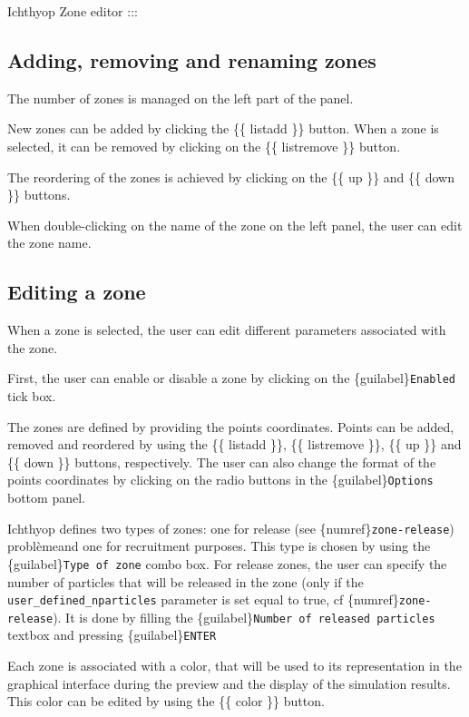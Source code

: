 \documentclass[
  letterpaper,
  DIV=11,
  numbers=noendperiod]{scrreprt}
\begin{document}
Ichthyop Zone editor :::

\subsection{Adding, removing and renaming
zones}\label{adding-removing-and-renaming-zones}

The number of zones is managed on the left part of the panel.

New zones can be added by clicking the \{\{ listadd \}\} button. When a
zone is selected, it can be removed by clicking on the \{\{ listremove
\}\} button.

The reordering of the zones is achieved by clicking on the \{\{ up \}\}
and \{\{ down \}\} buttons.

When double-clicking on the name of the zone on the left panel, the user
can edit the zone name.

\subsection{Editing a zone}\label{editing-a-zone}

When a zone is selected, the user can edit different parameters
associated with the zone.

First, the user can enable or disable a zone by clicking on the
\{guilabel\}\texttt{Enabled} tick box.

The zones are defined by providing the points coordinates. Points can be
added, removed and reordered by using the \{\{ listadd \}\}, \{\{
listremove \}\}, \{\{ up \}\} and \{\{ down \}\} buttons, respectively.
The user can also change the format of the points coordinates by
clicking on the radio buttons in the \{guilabel\}\texttt{Options} bottom
panel.

Ichthyop defines two types of zones: one for release (see
\{numref\}\texttt{zone-release}) problèmeand one for recruitment
purposes. This type is chosen by using the
\{guilabel\}\texttt{Type\ of\ zone} combo box. For release zones, the
user can specify the number of particles that will be released in the
zone (only if the \texttt{user\_defined\_nparticles} parameter is set
equal to true, cf \{numref\}\texttt{zone-release}). It is done by
filling the \{guilabel\}\texttt{Number\ of\ released\ particles} textbox
and pressing \{guilabel\}\texttt{ENTER}

Each zone is associated with a color, that will be used to its
representation in the graphical interface during the preview and the
display of the simulation results. This color can be edited by using the
\{\{ color \}\} button.
\end{document}
